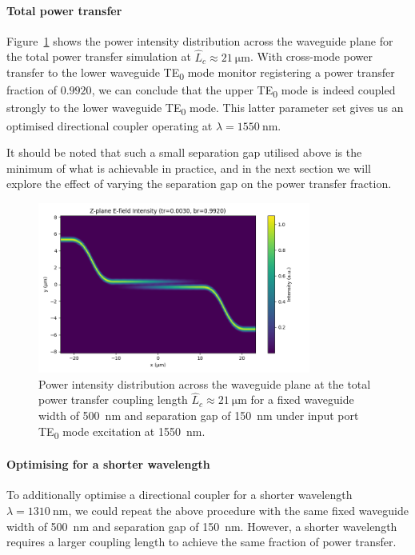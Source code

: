 \documentclass[10pt, a4paper]{article}
\begin{document}
\paragraph{Total power transfer}
Figure~\ref{fig:max_power_distribution} shows the power intensity distribution across the waveguide plane
for the total power transfer simulation at \(\hat{L}_c\approx\SI{21}{\um}\).
With cross-mode power transfer to the lower waveguide TE\textsubscript{0} mode monitor registering a power transfer fraction of
\(0.9920\), we can conclude that the upper TE\textsubscript{0} mode is indeed coupled strongly to the lower waveguide TE\textsubscript{0} mode.
This latter parameter set gives us an optimised directional coupler operating at \(\lambda=\SI{1550}{\nm}\).

It should be noted that such a small separation gap utilised above is the minimum of what is achievable in practice,
and in the next section we will explore the effect of varying the separation gap on the power transfer fraction.

\begin{figure}[h!]
  \centering
  \includegraphics[width=0.8\textwidth]{task3/sim_2318_110625/z_plane_intensity.png}
  \caption{Power intensity distribution across the waveguide plane at the total power transfer coupling length \(\hat{L}_c\approx\SI{21}{\um}\) for a fixed waveguide width of \SI{500}{\nm} and separation gap of \SI{150}{\nm} under input port TE\textsubscript{0} mode excitation at \SI{1550}{\nm}.}
  \label{fig:max_power_distribution}
\end{figure}

\paragraph{Optimising for a shorter wavelength}
To additionally optimise a directional coupler for a shorter wavelength \(\lambda=\SI{1310}{\nm}\), we could repeat the above procedure with the same fixed waveguide width of \SI{500}{\nm} and separation gap of \SI{150}{\nm}.
However, a shorter wavelength requires a larger coupling length to achieve the same fraction of power transfer.
\end{document}
